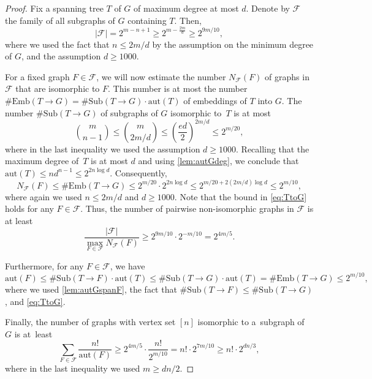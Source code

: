 \documentclass[letterpaper,11pt]{article}
\newcommand{\Fc}{\mathcal{F}}
\theoremstyle{definition}
\theoremstyle{remark}
\newcommand{\aut}{\mathrm{aut}}
\newcommand{\sub}{\#\mathrm{Sub}}
\newcommand{\emb}{\#\mathrm{Emb}}
\renewcommand{\leq}{\leqslant}
\renewcommand{\geq}{\geqslant}
\begin{document}
	\begin{proof}
		Fix a spanning tree $T$ of $G$ of maximum degree at most $d$.
		Denote by $\Fc$ the family of all subgraphs of $G$ containing $T$. Then, 
		\[
		|\Fc| = 2^{m-n+1} \geq 2^{m - \frac{2m}{d}} \geq  2^{9m/10},
		\]
		where we used the fact that $n \leq 2m/d$ by the assumption on the minimum degree of $G$, and the assumption $d\geq 1000$.

		For a fixed graph $F \in \Fc$, we will now estimate the number $N_{\Fc}(F)$ of graphs in $\Fc$ that are isomorphic to $F$. This number is at most the number $\emb(T \rightarrow G) = \sub(T \rightarrow G)\cdot \aut(T)$ of embeddings of $T$ into $G$. The number $\sub(T \rightarrow G)$ of subgraphs of $G$ isomorphic to~$T$ is at most 
		\begin{equation*}
			\binom{m}{n-1} \leq \binom{m}{2m/d} \leq \left(\frac{ed}{2} \right)^{2m/d}\leq   2^{m/20},
		\end{equation*}
		where in the last inequality we used the assumption $d \geq 1000$.
		Recalling that the maximum degree of~$T$ is at most $d$ and using \cref{lem:autGdeg}, we conclude that $\aut(T) \leq n d^{n-1} \leq 2^{2n \log d}$.
		Consequently,
                \begin{equation}\label{eq:TtoG} 
			N_{\Fc}(F) \leq \emb(T \rightarrow G) \leq 2^{m/20}\cdot 2^{ 2n \log d} \leq 2^{m/20 + 2(2m/d)\log d } \leq 2^{m/10}, 
		\end{equation} where again we used $n\leq 2m/d$ and $d\geq 1000$. Note that the bound in \eqref{eq:TtoG} holds for any $F\in \mathcal{F}$. Thus, the number of pairwise non-isomorphic graphs in $\Fc$ is at least \[\frac{|\Fc|}{\max_{F\in \mathcal{F}}N_{\Fc}(F)} \geq 2^{9m/10}\cdot 2^{- m/10} = 2^{4m/5}.\]
		
		Furthermore, for any $F\in \mathcal{F}$, we have 
		\[
		\aut(F) \leq \sub(T \rightarrow F)\cdot\aut(T) \leq \sub(T \rightarrow G)\cdot\aut(T) = \emb(T \rightarrow G) \leq 2^{m/10}, 
		\]
		where we used \cref{lem:autGspanF}, the fact that $\sub(T \rightarrow F) \leq \sub(T \rightarrow G)$, and \eqref{eq:TtoG}.

         Finally, the number of graphs with vertex set $[n]$ isomorphic to a~subgraph of $G$ is at~least
		\[
		\sum_{F \in \Fc} \frac{n!}{\aut(F)} 
		\geq 2^{4m/5} \cdot \frac{n!}{2^{m/10}} 
		= n! \cdot 2^{7m/10} 
		\geq  n! \cdot 2^{dn/3},
                \]
                where in the last inequality we used $m\geq dn/2$. 
        \end{proof}
\end{document}

